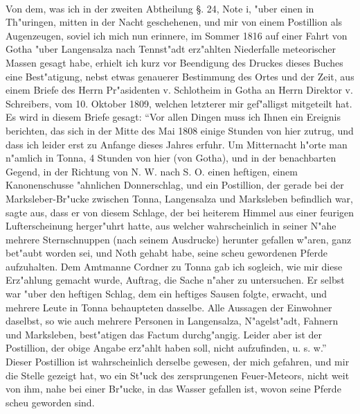 \documentclass[a4paper, 11pt, oneside, polutonikogreek, german]{article}
\begin{document}
\paragraph{}
Von dem, was ich in der zweiten Abtheilung §. 24, Note i, "uber einen in Th"uringen, mitten in der Nacht geschehenen, und mir von einem Postillion als Augenzeugen, soviel ich mich nun erinnere, im Sommer 1816 auf einer Fahrt von Gotha "uber Langensalza nach Tennst"adt erz"ahlten Niederfalle meteorischer Massen gesagt habe, erhielt ich kurz vor Beendigung des Druckes dieses Buches eine Best"atigung, nebst etwas genauerer Bestimmung des Ortes und der Zeit, aus einem Briefe des Herrn Pr"asidenten v. Schlotheim in Gotha an Herrn Direktor v. Schreibers, vom 10. Oktober 1809, welchen letzterer mir gef"alligst mitgeteilt hat. Es wird in diesem Briefe gesagt: "`Vor allen Dingen muss ich Ihnen ein Ereignis berichten, das sich in der Mitte des Mai 1808 einige Stunden von hier zutrug, und dass ich leider erst zu Anfange dieses Jahres erfuhr. Um Mitternacht h"orte man n"amlich in Tonna, 4 Stunden von hier (von Gotha), und in der benachbarten Gegend, in der Richtung von N. W. nach S. O. einen heftigen, einem Kanonenschusse "ahnlichen Donnerschlag, und ein Postillion, der gerade bei der Marksleber-Br"ucke zwischen Tonna, Langensalza und Marksleben befindlich war, sagte aus, dass er von diesem Schlage, der bei heiterem Himmel aus einer feurigen Lufterscheinung herger"uhrt hatte, aus welcher wahrscheinlich in seiner N"ahe mehrere Sternschnuppen (nach seinem Ausdrucke) herunter gefallen w"aren, ganz bet"aubt worden sei, und Noth gehabt habe, seine scheu gewordenen Pferde aufzuhalten. Dem Amtmanne Cordner zu Tonna gab ich sogleich, wie mir diese Erz"ahlung gemacht wurde, Auftrag, die Sache n"aher zu untersuchen. Er selbst war "uber den heftigen Schlag, dem ein heftiges Sausen folgte, erwacht, und mehrere Leute in Tonna behaupteten dasselbe. Alle Aussagen der Einwohner daselbst, so wie auch mehrere Personen in Langensalza, N"agelst"adt, Fahnern und Marksleben, best"atigen das Factum durchg"angig. Leider aber ist der Postillion, der obige Angabe erz"ahlt haben soll, nicht aufzufinden, u. s. w."' Dieser Postillion ist wahrscheinlich derselbe gewesen, der mich gefahren, und mir die Stelle gezeigt hat, wo ein St"uck des zersprungenen Feuer-Meteors, nicht weit von ihm, nahe bei einer Br"ucke, in das Wasser gefallen ist, wovon seine Pferde scheu geworden sind.
\section{}
\end{document}
